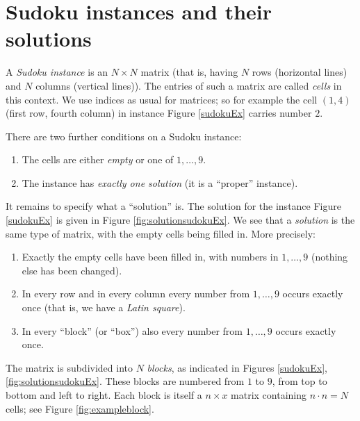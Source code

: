 \documentclass[11pt]{report}
\begin{document}
\section{Sudoku instances and their solutions}
\label{sec:Sudokuinstances}

A \textit{Sudoku instance} is an $N \times N$ matrix (that is, having $N$ rows (horizontal lines) and $N$ columns (vertical lines)). The entries of such a matrix are called \textit{cells} in this context. We use indices as usual for matrices; so for example the cell $(1,4)$ (first row, fourth column) in instance Figure \ref{sudokuEx} carries number $2$.

There are two further conditions on a Sudoku instance:
\begin{enumerate}
\item The cells are either \emph{empty} or one of $1, \dots, 9$.
\item The instance has \emph{exactly one solution} (it is a ``proper'' instance).
\end{enumerate}

It remains to specify what a ``solution'' is. The solution for the instance Figure \ref{sudokuEx} is given in Figure \ref{fig:solutionsudokuEx}. We see that a \textit{solution} is the same type of matrix, with the empty cells being filled in. More precisely:
\begin{enumerate}
\item Exactly the empty cells have been filled in, with numbers in $1,\dots,9$ (nothing else has been changed).
\item In every row and in every column every number from $1,\dots,9$ occurs exactly once (that is, we have a \emph{Latin square}).
\item In every ``block'' (or ``box'') also every number from $1,\dots,9$ occurs exactly once.
\end{enumerate}

The matrix is subdivided into $N$ \textit{blocks}, as indicated in Figures \ref{sudokuEx}, \ref{fig:solutionsudokuEx}. These blocks are numbered from $1$ to $9$, from top to bottom and left to right. Each block is itself a $n \times x$ matrix containing $n \cdot n = N$ cells; see Figure \ref{fig:exampleblock}.
\end{document}
